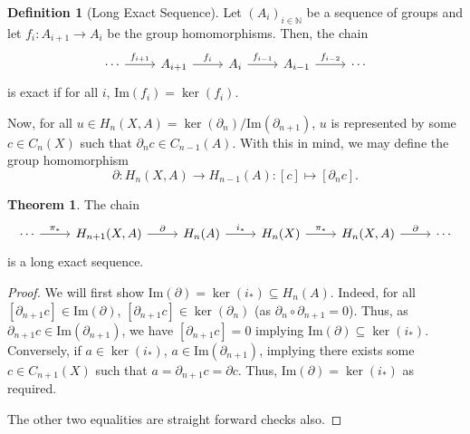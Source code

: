 \documentclass[]{article}
\theoremstyle{definition}
\newtheorem{theorem}{Theorem}
\theoremstyle{definition}
\newtheorem{definition}{Definition}[section]
\begin{document}
\begin{definition}[Long Exact Sequence]
  Let \((A_i)_{i \in \mathbb{N}}\) be a sequence of groups and let 
  \(f_i : A_{i + 1} \to A_i\) be the group homomorphisms. Then, the chain 
  \[\begin{tikzcd}
    \cdots & {A_{i + 1}} & {A_i} & {A_{i - 1}} & \cdots
    \arrow["{f_i}", from=1-2, to=1-3]
    \arrow["{f_{i + 1}}", from=1-1, to=1-2]
    \arrow["{f_{i - 1}}", from=1-3, to=1-4]
    \arrow["{f_{i - 2}}", from=1-4, to=1-5]
  \end{tikzcd}\]
  is exact if for all \(i\), \(\text{Im}(f_i) = \ker(f_i)\).
\end{definition}

Now, for all \(u \in H_n(X, A) = \ker(\partial_n) / \text{Im}(\partial_{n + 1})\),
\(u\) is represented by some \(c \in C_n(X)\) such that 
\(\partial_n c \in C_{n - 1}(A)\). With this in mind, we may define the 
group homomorphism 
\[\partial : H_n(X, A) \to H_{n - 1}(A) : [c] \mapsto [\partial_n c].\]

\begin{theorem}
  The chain
  \[\begin{tikzcd}
    \cdots & {H_{n + 1}(X, A)} & {H_n(A)} & {H_n(X)} & {H_n(X, A)} & \cdots
    \arrow["\pi_*", from=1-1, to=1-2]
    \arrow["\partial", from=1-2, to=1-3]
    \arrow["{i_*}", from=1-3, to=1-4]
    \arrow["{\pi_*}", from=1-4, to=1-5]
    \arrow["\partial", from=1-5, to=1-6]
  \end{tikzcd}\]
  is a long exact sequence.
\end{theorem}
\begin{proof}
  We will first show \(\text{Im}(\partial) = \ker(i_*) \subseteq H_n(A)\). 
  Indeed, for all \([\partial_{n + 1} c] \in \text{Im}(\partial)\), 
  \([\partial_{n + 1} c] \in \ker(\partial_n)\) (as \(\partial_n \circ \partial_{n + 1} = 0\)).
  Thus, as \(\partial_{n + 1}c \in \text{Im}(\partial_{n + 1})\), we have 
  \([\partial_{n + 1} c] = 0\) implying \(\text{Im}(\partial) \subseteq \ker(i_*)\).
  Conversely, if \(a \in \ker(i_*)\), \(a \in \text{Im}(\partial_{n + 1})\), 
  implying there exists some \(c \in C_{n + 1}(X)\) such that 
  \(a = \partial_{n + 1} c = \partial c\). Thus, 
  \(\text{Im}(\partial) = \ker(i_*)\) as required. 

  The other two equalities are straight forward checks also.
\end{proof}
\end{document}
